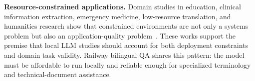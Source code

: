 \textbf{Resource-constrained applications.} Domain studies in education,
clinical information extraction, emergency medicine, low-resource translation,
and humanities research show that constrained environments are not only a
systems problem but also an application-quality problem~\cite{barros2025evaluating,builtjes2025leveraging,mensah2024ambulance,posada2024medical,li2025comparative,zhong2026opportunities}. These works support the premise that
local LLM studies should account for both deployment constraints and domain
task validity. Railway bilingual QA shares this pattern: the model must be
affordable to run locally and reliable enough for specialized terminology and
technical-document assistance.
